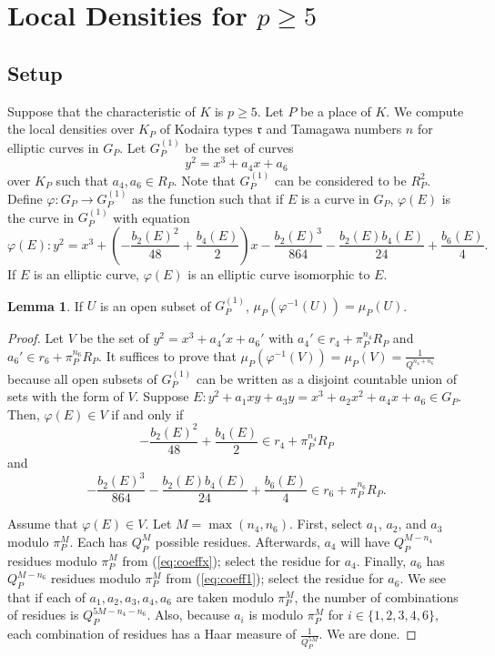 \documentclass[12pt,letterpaper]{amsart}
\theoremstyle{definition}
\newtheorem{lemma}[theorem]{Lemma}
\begin{document}
\section{Local Densities for \texorpdfstring{$p\geq 5$}{}}
\label{sec:locala}

\subsection{Setup}

Suppose that the characteristic of $K$ is $p\geq 5$. Let $P$ be a place of $K$. We compute the local densities over $K_P$ of Kodaira types $\mathfrak{r}$ and Tamagawa numbers $n$ for elliptic curves in $G_P$. Let $G_P^{(1)}$ be the set of curves
\[
y^2=x^3+a_4x+a_6
\]
over $K_P$ such that $a_4,a_6\in R_P$. Note that $G_P^{(1)}$ can be considered to be $R_P^2$. Define $\varphi: G_P\rightarrow G_P^{(1)}$ as the function such that if $E$ is a curve in $G_P$, $\varphi(E)$ is the curve in $G_P^{(1)}$ with equation
\[
\varphi(E): y^2=x^3+\left(-\frac{b_2(E)^2}{48}+\frac{b_4(E)}{2}\right)x-\frac{b_2(E)^3}{864}-\frac{b_2(E)b_4(E)}{24}+\frac{b_6(E)}{4}.
\]
If $E$ is an elliptic curve, $\varphi(E)$ is an elliptic curve isomorphic to $E$.

\begin{lemma}
\label{invdensity1}
If $U$ is an open subset of $G_P^{(1)}$, $\mu_P(\varphi^{-1}(U))=\mu_P(U)$.
\end{lemma}

\begin{proof}
Let $V$ be the set of $y^2=x^3+a_4'x+a_6'$ with $a_4'\in r_4+\pi_P^{n_4}R_P$ and $a_6'\in r_6+\pi_P^{n_6}R_P$. It suffices to prove that $\mu_P(\varphi^{-1}(V))=\mu_P(V)=\frac{1}{Q^{n_4+n_6}}$ because all open subsets of $G_P^{(1)}$ can be written as a disjoint countable union of sets with the form of $V$. Suppose $E: y^2+a_1xy+a_3y=x^3+a_2x^2+a_4x+a_6\in G_P$. Then, $\varphi(E)\in V$ if and only if
\begin{equation}
\label{eq:coeffx}
-\frac{b_2(E)^2}{48}+\frac{b_4(E)}{2}\in r_4+\pi_P^{n_4}R_P
\end{equation}
and 
\begin{equation}
\label{eq:coeff1}
-\frac{b_2(E)^3}{864}-\frac{b_2(E)b_4(E)}{24}+\frac{b_6(E)}{4}\in r_6+\pi_P^{n_6}R_P.
\end{equation}

Assume that $\varphi(E)\in V$. Let $M=\max(n_4,n_6)$. First, select $a_1$, $a_2$, and $a_3$ modulo $\pi_P^M$. Each has $Q_P^M$ possible residues. Afterwards, $a_4$ will have $Q_P^{M-n_4}$ residues modulo $\pi_P^M$ from (\ref{eq:coeffx}); select the residue for $a_4$. Finally, $a_6$ has $Q_P^{M-n_6}$ residues modulo $\pi_P^M$ from (\ref{eq:coeff1}); select the residue for $a_6$. We see that if each of $a_1,a_2,a_3,a_4,a_6$ are taken modulo $\pi_P^M$, the number of combinations of residues is $Q_P^{5M-n_4-n_6}$. Also, because $a_i$ is modulo $\pi_P^M$ for $i\in\{1,2,3,4,6\}$, each combination of residues has a Haar measure of $\frac{1}{Q_P^{5M}}$. We are done.
\end{proof}
\end{document}
